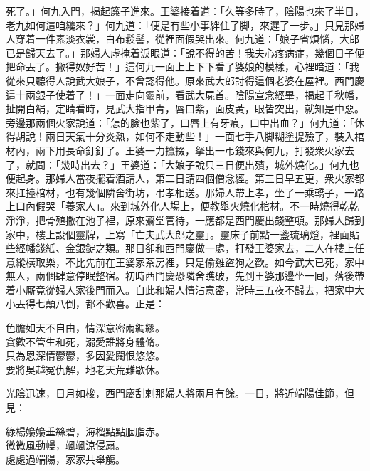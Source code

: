 死了。」何九入門，揭起簾子進來。王婆接着道：「久等多時了，陰陽也來了半日，老九如何這咱纔來？」何九道：「便是有些小事絆住了脚，來遲了一步。」只見那婦人穿着一件素淡衣裳，白布鬏髻，從裡面假哭出來。何九道：「娘子省煩惱，大郎已是歸天去了。」那婦人虛掩着淚眼道：「說不得的苦！我夫心疼病症，幾個日子便把命丟了。撇得奴好苦！」這何九一面上上下下看了婆娘的模樣，心裡暗道：「我從來只聽得人說武大娘子，不曾認得他。原來武大郎討得這個老婆在屋裡。西門慶這十兩銀子使着了！」一面走向靈前，看武大屍首。陰陽宣念經畢，揭起千秋幡，扯開白絹，定睛看時，見武大指甲青，唇口紫，面皮黃，眼皆突出，就知是中惡。旁邊那兩個火家說道：「怎的臉也紫了，口唇上有牙痕，口中出血？」何九道：「休得胡說！兩日天氣十分炎熱，如何不走動些！」一面七手八脚糊塗提殮了，裝入棺材內，兩下用長命釘釘了。王婆一力攛掇，拏出一弔錢來與何九，打發衆火家去了，就問：「幾時出去？」王婆道：「大娘子說只三日便出殯，城外燒化。」何九也便起身。那婦人當夜擺着酒請人，第二日請四個僧念經。第三日早五更，衆火家都來扛擡棺材，也有幾個隣舍街坊，弔孝相送。那婦人帶上孝，坐了一乘轎子，一路上口內假哭「養家人」。來到城外化人場上，便教舉火燒化棺材。不一時燒得乾乾淨淨，把骨殖撒在池子裡，原來齋堂管待，一應都是西門慶出錢整頓。那婦人歸到家中，樓上設個靈牌，上寫「亡夫武大郎之靈」。{}靈床子前點一盞琉璃燈，裡面貼些經幡錢紙、金銀錠之類。那日卻和西門慶做一處，打發王婆家去，二人在樓上任意縱橫取樂，不比先前在王婆家茶房裡，只是偷雞盜狗之歡。如今武大已死，家中無人，兩個肆意停眠整宿。初時西門慶恐隣舍瞧破，先到王婆那邊坐一囘，落後帶着小厮竟從婦人家後門而入。自此和婦人情沾意密，常時三五夜不歸去，把家中大小丟得七顛八倒，都不歡喜。正是：

\begin{myquote} 
色膽如天不自由，情深意密兩綢繆。\\貪歡不管生和死，溺愛誰將身體脩。\\只為恩深情鬱鬱，多因愛闊恨悠悠。\\要將吳越冤仇解，地老天荒難歇休。
\end{myquote} 

光陰迅速，日月如梭，西門慶刮剌那婦人將兩月有餘。一日，將近端陽佳節，但見：

\begin{myquote} 
綠楊嬝嬝垂絲碧，海榴點點胭脂赤。\\微微風動幔，颯颯涼侵扇。\\處處過端陽，家家共舉觴。
\end{myquote} 

